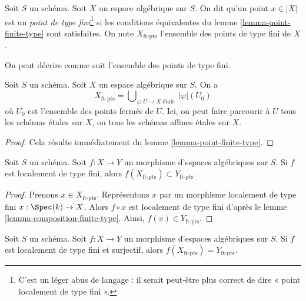 \begin{definition}
\label{definition-finite-type-point}
Soit $S$ un schéma. Soit $X$ un espace algébrique sur $S$.
On dit qu'un point $x \in |X|$ est un {\it point de type fini}\footnote{C'est un
léger abus de langage : il serait peut-être plus correct de dire
« point localement de type fini ».} si les conditions équivalentes du
lemme \ref{lemma-point-finite-type}
sont satisfaites. On note $X_{\text{ft-pts}}$ l'ensemble des points de type fini
de $X$.
\end{definition}

\noindent
On peut décrire comme suit l'ensemble des points de type fini.

\begin{lemma}
\label{lemma-identify-finite-type-points}
Soit $S$ un schéma. Soit $X$ un espace algébrique sur $S$. On a
$$
X_{\text{ft-pts}} =
\bigcup\nolimits_{\varphi : U \to X\text{ étale }} |\varphi|(U_0)
$$
où $U_0$ est l'ensemble des points fermés de $U$.
Ici, on peut faire parcourir à $U$ tous les schémas étales sur $X$, ou tous les
schémas affines étales sur $X$.
\end{lemma}

\begin{proof}
Cela résulte immédiatement du
lemme \ref{lemma-point-finite-type}.
\end{proof}

\begin{lemma}
\label{lemma-finite-type-points-morphism}
Soit $S$ un schéma.
Soit $f : X \to Y$ un morphisme d'espaces algébriques sur $S$.
Si $f$ est localement de type fini, alors
$f(X_{\text{ft-pts}}) \subset Y_{\text{ft-pts}}$.
\end{lemma}

\begin{proof}
Prenons $x \in X_{\text{ft-pts}}$. Représentons $x$ par un morphisme localement de type fini
$x : \Spec(k) \to X$. Alors $f \circ x$ est localement de type fini d'après le
lemme \ref{lemma-composition-finite-type}.
Ainsi, $f(x) \in Y_{\text{ft-pts}}$.
\end{proof}

\begin{lemma}
\label{lemma-finite-type-points-surjective-morphism}
Soit $S$ un schéma.
Soit $f : X \to Y$ un morphisme d'espaces algébriques sur $S$.
Si $f$ est localement de type fini et surjectif, alors
$f(X_{\text{ft-pts}}) = Y_{\text{ft-pts}}$.
\end{lemma}

